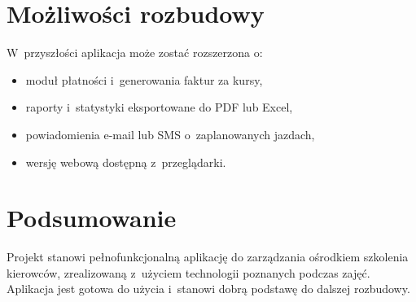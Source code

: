 \section{Mo\.{z}liwo\'{s}ci rozbudowy}

W~przysz\l{}o\'{s}ci aplikacja mo\.{z}e zosta\'{c} rozszerzona o:
\begin{itemize}
  \item modu\l{} p\l{}atno\'{s}ci i~generowania faktur za kursy,
  \item raporty i~statystyki eksportowane do PDF lub Excel,
  \item powiadomienia e-mail lub SMS o~zaplanowanych jazdach,
  \item wersj\k{e} webow\k{a} dost\k{e}pn\k{a} z~przegl\k{a}darki.
\end{itemize}

\section{Podsumowanie}

Projekt stanowi pe\l{}nofunkcjonaln\k{a} aplikacj\k{e} do zarz\k{a}dzania
o\'{s}rodkiem szkolenia kierowc\'{o}w, zrealizowan\k{a} z~u\.{z}yciem technologii
poznanych podczas zaj\k{e}\'{c}. Aplikacja jest gotowa do u\.{z}ycia
i~stanowi dobr\k{a} podstaw\k{e} do dalszej rozbudowy.
